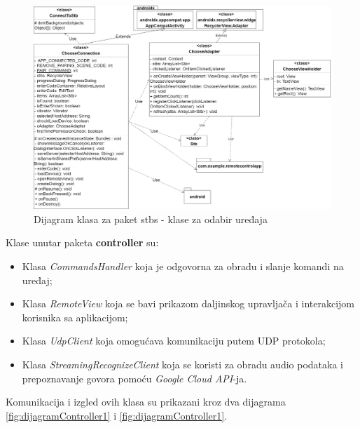 \documentclass[implementacija.tex]{subfiles}
\begin{document}
\begin{figure}
    \centering
    \includegraphics[width=0.9\textheight]{Implementacija/dijagrami/stbs_package_2.drawio.png}
    \caption{Dijagram klasa za paket stbs - klase za odabir uređaja}
    \label{fig:dijagramStbs2}
\end{figure}



Klase unutar paketa \textbf{controller} su:
\begin{itemize}
\item Klasa \textit{CommandsHandler} koja je odgovorna za obradu i slanje komandi na uređaj;
\item Klasa \textit{RemoteView} koja se bavi prikazom daljinskog upravljača i interakcijom korisnika sa aplikacijom;
\item Klasa \textit{UdpClient} koja omogućava komunikaciju putem UDP protokola;
\item Klasa \textit{StreamingRecognizeClient} koja se koristi za obradu audio podataka i prepoznavanje govora pomoću \textit{Google Cloud API}-ja. 
\end{itemize}
Komunikacija i izgled ovih klasa su prikazani kroz dva dijagrama \ref{fig:dijagramController1} i \ref{fig:dijagramController1}.
\end{document}
